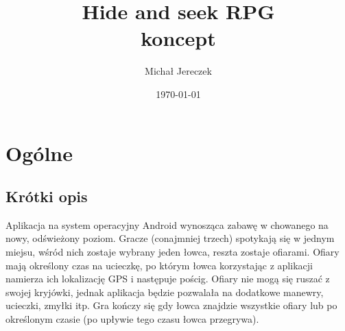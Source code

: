 \documentclass[a4paper,11pt,notitlepage]{article}
\author{Michał Jereczek}
\title{ Hide and seek RPG \\ {\small koncept}}
\date{\today}
\begin{document}
\maketitle
\tableofcontents
\pagebreak

\section{Ogólne}
\subsection{Krótki opis}
Aplikacja na system operacyjny Android wynosząca zabawę w chowanego na nowy, odświeżony poziom. Gracze (conajmniej trzech) spotykają się w jednym miejsu, wśród nich zostaje wybrany jeden łowca, reszta zostaje ofiarami. Ofiary mają określony czas na ucieczkę, po którym łowca korzystając z aplikacji namierza ich lokalizację GPS i następuje pościg. Ofiary nie mogą się ruszać z swojej kryjówki, jednak aplikacja będzie pozwalała na dodatkowe manewry, ucieczki, zmyłki itp. Gra kończy się gdy łowca znajdzie wszystkie ofiary lub po określonym czasie (po upływie tego czasu łowca przegrywa).
\end{document}
